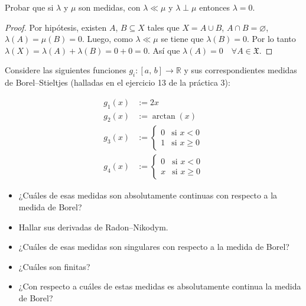 \documentclass[12pt]{article}
\newenvironment{statement}[2][Ejercicio]{\begin{trivlist}
\item[\hskip \labelsep {\bfseries #1}\hskip \labelsep {\bfseries #2.}]}{\end{trivlist}}
\begin{document}
\begin{statement}{9}
    Probar que si \(\lambda \) y \(\mu \) son medidas, con \(\lambda \ll \mu \) y \(\lambda \perp \mu \) entonces \(\lambda = 0 \).
\end{statement}

\begin{proof}
    Por hipótesis, existen \(A \), \(B \subseteq X \) tales que \(X = A \cup B \), \(A \cap B = \varnothing \), \(\lambda(A) = \mu(B) = 0 \). Luego, como \(\lambda \ll \mu \) se tiene que \(\lambda(B) = 0 \). Por lo tanto \(\lambda(X) = \lambda(A) + \lambda(B) = 0 + 0 = 0 \). Así que \(\lambda(A) = 0 \quad \forall A \in \mathfrak{X} \).
\end{proof}

\begin{statement}{10}
    Considere las siguientes funciones \(g_i : [a\text{, }b] \to \mathbb{R} \) y sus correspondientes medidas de Borel–Stieltjes (halladas en el ejercicio 13 de la práctica 3):

    \begin{align*}
        g_1(x) & := 2x                      \\
        g_2(x) & := \arctan(x)              \\
        g_3(x) & := \begin{cases}
                        0 & \text{si } x < 0    \\
                        1 & \text{si } x \geq 0
                    \end{cases} \\
        g_4(x) & := \begin{cases}
                        0 & \text{si } x < 0    \\
                        x & \text{si } x \geq 0
                    \end{cases}
    \end{align*}

    \begin{itemize}
        \item[(a)] ¿Cuáles de esas medidas son absolutamente continuas con respecto a la medida de Borel?
        \item[(b)] Hallar sus derivadas de Radon–Nikodym.
        \item[(c)] ¿Cuáles de esas medidas son singulares con respecto a la medida de Borel?
        \item[(d)] ¿Cuáles son finitas?
        \item[(e)] ¿Con respecto a cuáles de estas medidas es absolutamente continua la medida de Borel?
    \end{itemize}
\end{statement}
\end{document}

